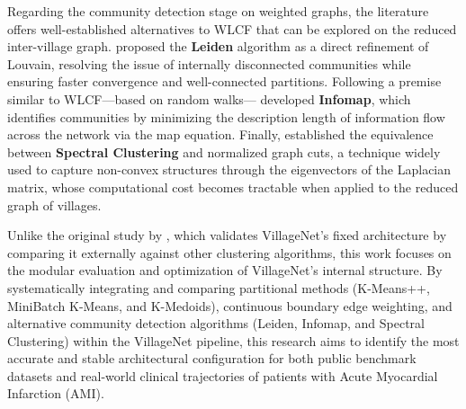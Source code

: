 \documentclass[12pt, a4paper]{article}
\begin{document}
Regarding the community detection stage on weighted graphs, the literature offers well-established alternatives to WLCF that can be explored on the reduced inter-village 
graph. \citet{traag2019leiden} proposed the \textbf{Leiden} algorithm as a direct refinement of Louvain, resolving the issue of internally disconnected communities while 
ensuring faster convergence and well-connected partitions. Following a premise similar to WLCF---based on random walks---\citet{rosvall2008infomap} developed \textbf{Infomap}, 
which identifies communities by minimizing the description length of information flow across the network via the map equation. Finally, \citet{dhillon2004spectral} 
established the equivalence between \textbf{Spectral Clustering} and normalized graph cuts, a technique widely used to capture non-convex structures through the 
eigenvectors of the Laplacian matrix, whose computational cost becomes tractable when applied to the reduced graph of villages.

Unlike the original study by \citet{ballal2026villagenet}, which validates VillageNet's fixed architecture by comparing it externally against other clustering algorithms, 
this work focuses on the modular evaluation and optimization of VillageNet's internal structure. By systematically integrating and comparing partitional methods 
(K-Means++, MiniBatch K-Means, and K-Medoids), continuous boundary edge weighting, and alternative community detection algorithms (Leiden, Infomap, and Spectral 
Clustering) within the VillageNet pipeline, this research aims to identify the most accurate and stable architectural configuration for both public benchmark 
datasets and real-world clinical trajectories of patients with Acute Myocardial Infarction (AMI).



\end{document}
